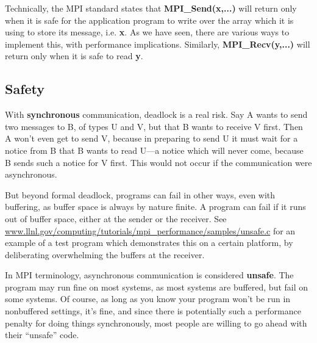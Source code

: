 Technically, the MPI standard states that {\bf MPI\_Send(x,...)} will
return only when it is safe for the application program to write over
the array which it is using to store its message, i.e. {\bf x}.  As we
have seen, there are various ways to implement this, with performance
implications.  Similarly, {\bf MPI\_Recv(y,...)} will return only when
it is safe to read {\bf y}.


\subsection{Safety}

With {\bf synchronous} communication, deadlock is a real risk.  Say A
wants to send two messages to B, of types U and V, but that B wants to
receive V first.  Then A won't even get to send V, because in preparing
to send U it must wait for a notice from B that B wants to read U---a
notice which will never come, because B sends such a notice for V first.
This would not occur if the communication were asynchronous.

But beyond formal deadlock, programs can fail in other ways, even with
buffering, as buffer space is always by nature finite.  A program can
fail if it runs out of buffer space, either at the sender or the
receiver.  See
\url{www.llnl.gov/computing/tutorials/mpi_performance/samples/unsafe.c}
for an example of a test program which demonstrates this on a certain
platform, by deliberating overwhelming the buffers at the receiver.

In MPI terminology, asynchronous communication is considered {\bf
unsafe}.  The program may run fine on most systems, as most systems are
buffered, but fail on some systems.  Of course, as long as you know your
program won't be run in nonbuffered settings, it's fine, and since there
is potentially such a performance penalty for doing things
synchronously, most people are willing to go ahead with their ``unsafe''
code.

